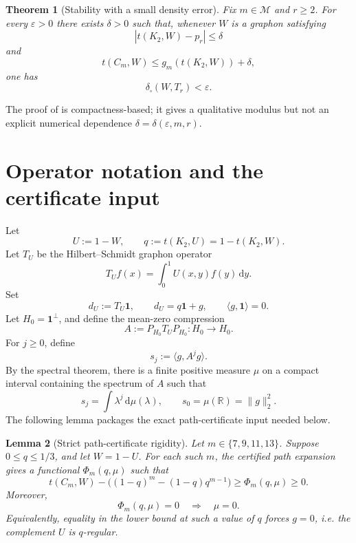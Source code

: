 \documentclass[11pt]{article}
\newtheorem{theorem}{Theorem}
\newtheorem{lemma}[theorem]{Lemma}
\newcommand{\one}{\mathbf 1}
\newcommand{\dd}{\,\mathrm d}
\newcommand{\cutdist}{\delta_{\square}}
\newcommand{\M}{\mathcal M}
\begin{document}
\begin{theorem}[Stability with a small density error]
\label{thm:density-error}
Fix \(m\in\M\) and \(r\ge 2\).  For every \(\varepsilon>0\) there exists
\(\delta>0\) such that, whenever \(W\) is a graphon satisfying
\[
        \left|t(K_2,W)-p_r\right|\le \delta
\]
and
\[
        t(C_m,W)\le g_m(t(K_2,W))+\delta,
\]
one has
\[
        \cutdist(W,T_r)<\varepsilon.
\]
\end{theorem}

The proof of  is compactness-based;
it gives a qualitative modulus but not an explicit numerical dependence
\(\delta=\delta(\varepsilon,m,r)\).

\section{Operator notation and the certificate input}

Let
\[
        U:=1-W, \qquad q:=t(K_2,U)=1-t(K_2,W).
\]
Let \(T_U\) be the Hilbert--Schmidt graphon operator
\[
        T_U f(x)=\int_0^1 U(x,y)f(y)\dd y .
\]
Set
\[
        d_U:=T_U\one,
        \qquad d_U=q\one+g,
        \qquad \langle g,\one\rangle=0.
\]
Let \(H_0=\one^\perp\), and define the mean-zero compression
\[
        A:=P_{H_0}T_U P_{H_0}:H_0\to H_0.
\]
For \(j\ge0\), define
\[
        s_j:=\langle g,A^j g\rangle.
\]
By the spectral theorem, there is a finite positive measure \(\mu\) on a compact
interval containing the spectrum of \(A\) such that
\[
        s_j=\int \lambda^j\dd\mu(\lambda),
        \qquad s_0=\mu(\mathbb R)=\|g\|_2^2.
\]
The following lemma packages the exact path-certificate input needed below.

\begin{lemma}[Strict path-certificate rigidity]
\label{lem:path-rigidity}
Let \(m\in\{7,9,11,13\}\).  Suppose \(0\le q\le1/3\), and let \(W=1-U\).
For each such \(m\), the certified path expansion gives a functional
\(\Phi_m(q,\mu)\) such that
\[
        t(C_m,W)-\bigl((1-q)^m-(1-q)q^{m-1}\bigr)
        \ge \Phi_m(q,\mu)\ge0.
\]
Moreover,
\[
        \Phi_m(q,\mu)=0 \quad\Longrightarrow\quad \mu=0.
\]
Equivalently, equality in the lower bound at such a value of \(q\) forces
\(g=0\), i.e. the complement \(U\) is \(q\)-regular.
\end{lemma}
\end{document}
